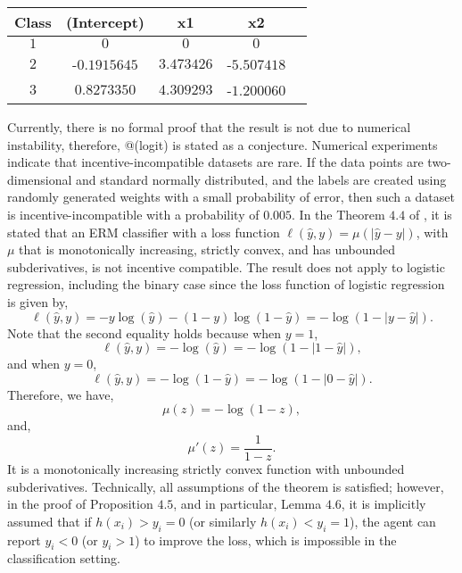 \documentclass{article}
\begin{document}
\begin{center} \begin{tabular}{|c|c|c|c|c|}
\hline
 Class &(Intercept) &x1 &x2\\ \hline
$1$ &$0$ &$0$ &$0$\\ \hline
$2$ &-$0.1915645$ &$3.473426$ &-$5.507418$\\ \hline
$3$ &$0.8273350$ &$4.309293$ &-$1.200060$\\ \hline
\end{tabular} \end{center}
Currently, there is no formal proof that the result is not due to numerical instability, therefore, @(logit) is stated as a conjecture. Numerical experiments indicate that incentive-incompatible datasets are rare. If the data points are two-dimensional and standard normally distributed, and the labels are created using randomly generated weights with a small probability of error, then such a dataset is incentive-incompatible with a probability of $0.005$.
\newline \newline
In the Theorem $4.4$ of \citet*{dekel2010incentive}, it is stated that an ERM classifier with a loss function $\ell\left(\hat{y}, y\right) = \mu\left(\left| \hat{y} - y \right|\right)$, with $\mu$ that is monotonically increasing, strictly convex, and has unbounded subderivatives, is not incentive compatible. The result does not apply to logistic regression, including the binary case since the loss function of logistic regression is given by,
\begin{equation} 
\ell\left(\hat{y}, y\right) = - y \log\left(\hat{y}\right) - \left(1 - y\right) \log\left(1 - \hat{y}\right) = -\log\left(1 - \left| y - \hat{y} \right|\right).
\end{equation}
Note that the second equality holds because when $y  = 1$,
\begin{equation} 
\ell\left(\hat{y}, y\right) = - \log\left(\hat{y}\right) = -\log\left(1-\left| 1 - \hat{y} \right|\right),
\end{equation}
and when $y  = 0$,
\begin{equation} 
\ell\left(\hat{y}, y\right) = - \log\left(1 - \hat{y}\right) = -\log\left(1 - \left| 0 - \hat{y} \right|\right).
\end{equation}
Therefore, we have,
\begin{equation} 
\mu\left(z\right) = -\log\left(1-z\right),
\end{equation}
and,
\begin{equation} 
\mu'\left(z\right) = \dfrac{1}{1-z} .
\end{equation}
It is a monotonically increasing strictly convex function with unbounded subderivatives. Technically, all assumptions of the theorem is satisfied; however, in the proof of Proposition $4.5$, and in particular, Lemma $4.6$, it is implicitly assumed that if $h\left(x_{i}\right)  > y_{i} = 0$ (or similarly $h\left(x_{i}\right)  < y_{i} = 1$), the agent can report $y_{i} < 0$ (or $y_{i} > 1$) to improve the loss, which is impossible in the classification setting.
\newline \newline
\end{document}
